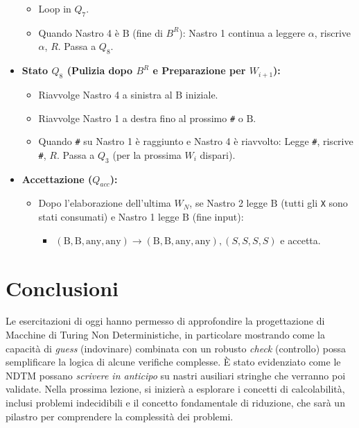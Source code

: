 \documentclass[a4paper, 11pt]{book} %
\theoremstyle{definition}
\newcommand{\B}{\text{B}} %
\begin{document}
\begin{itemize}
\begin{itemize}
            \item Loop in $Q_7$.
            \item Quando Nastro 4 è $\B$ (fine di $B^R$): Nastro 1 continua a leggere $\alpha$, riscrive $\alpha$, $R$. Passa a $Q_8$.
        \end{itemize}
    \item \textbf{Stato $Q_8$ (Pulizia dopo $B^R$ e Preparazione per $W_{i+1}$):}
        \begin{itemize}
            \item Riavvolge Nastro 4 a sinistra al $\B$ iniziale.
            \item Riavvolge Nastro 1 a destra fino al prossimo \texttt{\#} o $\B$.
            \item Quando \texttt{\#} su Nastro 1 è raggiunto e Nastro 4 è riavvolto: Legge \texttt{\#}, riscrive \texttt{\#}, $R$. Passa a $Q_3$ (per la prossima $W_i$ dispari).
        \end{itemize}
    \item \textbf{Accettazione ($Q_{acc}$):}
        \begin{itemize}
            \item Dopo l'elaborazione dell'ultima $W_N$, se Nastro 2 legge $\B$ (tutti gli \texttt{X} sono stati consumati) e Nastro 1 legge $\B$ (fine input):
                \begin{itemize}
                    \item $(\B, \B, \text{any}, \text{any}) \to (\B, \B, \text{any}, \text{any}), (S,S,S,S)$ e accetta.
                \end{itemize}
        \end{itemize}
\end{itemize}

\section{Conclusioni}
Le esercitazioni di oggi hanno permesso di approfondire la progettazione di Macchine di Turing Non Deterministiche, in particolare mostrando come la capacità di \textit{guess} (indovinare) combinata con un robusto \textit{check} (controllo) possa semplificare la logica di alcune verifiche complesse. È stato evidenziato come le NDTM possano \textit{scrivere in anticipo} su nastri ausiliari stringhe che verranno poi validate.
Nella prossima lezione, si inizierà a esplorare i concetti di calcolabilità, inclusi problemi indecidibili e il concetto fondamentale di riduzione, che sarà un pilastro per comprendere la complessità dei problemi.
\end{document}
